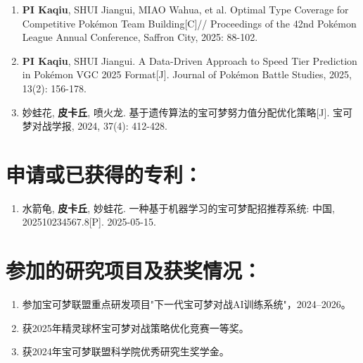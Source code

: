 {
\setlist[enumerate]{}%
\begin{enumerate}[nosep]
    \item \textbf{PI Kaqiu}, SHUI Jiangui, MIAO Wahua, et al. Optimal Type Coverage for Competitive Pokémon Team Building[C]// Proceedings of the 42nd Pokémon League Annual Conference, Saffron City, 2025: 88-102.
    \item \textbf{PI Kaqiu}, SHUI Jiangui. A Data-Driven Approach to Speed Tier Prediction in Pokémon VGC 2025 Format[J]. Journal of Pokémon Battle Studies, 2025, 13(2): 156-178.
    \item 妙蛙花, \textbf{皮卡丘}, 喷火龙. 基于遗传算法的宝可梦努力值分配优化策略[J]. 宝可梦对战学报, 2024, 37(4): 412-428.
\end{enumerate}
}

\section*{申请或已获得的专利：}

\begin{enumerate}[nosep]
    \item 水箭龟, \textbf{皮卡丘}, 妙蛙花. 一种基于机器学习的宝可梦配招推荐系统: 中国, 202510234567.8[P]. 2025-05-15.
\end{enumerate}

\section*{参加的研究项目及获奖情况：}

\begin{enumerate}[nosep]
    \item 参加宝可梦联盟重点研发项目"下一代宝可梦对战AI训练系统"，2024--2026。
    \item 获2025年精灵球杯宝可梦对战策略优化竞赛一等奖。
    \item 获2024年宝可梦联盟科学院优秀研究生奖学金。
\end{enumerate}

\cleardoublepage[plain]%
